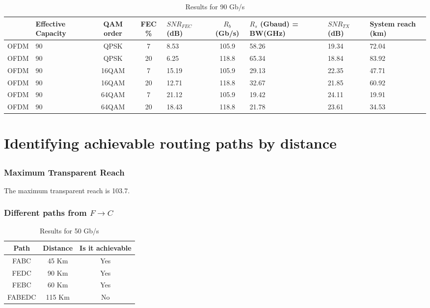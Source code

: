 \documentclass{article}
\begin{document}
\begin{table}[htb!]
    \begin{tabular}{|c|p{1.5cm}|c|c|p{1.5cm}|c|p{1.5cm}|p{1.5cm}|p{1cm}|}
    \hline
         & Effective Capacity & QAM order & FEC \%  &  $SNR_{FEC}$ (dB) & $R_b$ (Gb/s) & $R_s$ (Gbaud) = BW(GHz) & $SNR_{TX}$ (dB) & System reach (km) \\ \hline
         OFDM & 90 & QPSK & 7 & 8.53 & 105.9 & 58.26 & 19.34 & 72.04 \\ \hline
         OFDM & 90 & QPSK & 20 & 6.25 & 118.8 & 65.34 & 18.84 & 83.92 \\ \hline
         OFDM & 90 & 16QAM & 7 & 15.19 & 105.9 & 29.13 & 22.35 & 47.71 \\ \hline
         OFDM & 90 & 16QAM & 20 & 12.71 & 118.8 & 32.67 & 21.85 & 60.92 \\ \hline
         OFDM & 90 & 64QAM & 7 & 21.12 & 105.9 & 19.42 & 24.11 &  19.91 \\ \hline
         OFDM & 90 & 64QAM & 20 & 18.43 & 118.8 & 21.78 & 23.61 & 34.53 \\ \hline

    \end{tabular}
    \caption{Results for 90 Gb/s}
\end{table}


\section{Identifying achievable routing paths by distance}
\setcounter{subsection}{1}
\subsection{}
\subsubsection{Maximum Transparent Reach}

The maximum transparent reach is 103.7.

\subsubsection{Different paths from $F \to C$}

\begin{table}[htb!]
    \centering
    \begin{tabular}{|c|c|c|}
    \hline
         Path & Distance & Is it achievable \\ \hline
         FABC & 45 Km & Yes \\ \hline
         FEDC & 90 Km & Yes \\ \hline
         FEBC & 60 Km & Yes\\ \hline
         FABEDC & 115 Km & No \\ \hline

    \end{tabular}
    \caption{Results for 50 Gb/s}
\end{table}
\end{document}
